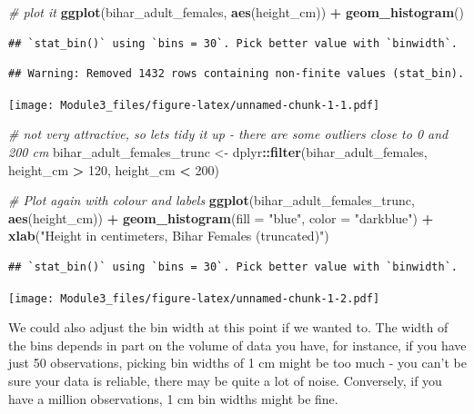\documentclass[]{book}
\newenvironment{Shaded}{\begin{snugshade}}{\end{snugshade}}
\newcommand{\KeywordTok}[1]{\textcolor[rgb]{0.13,0.29,0.53}{\textbf{#1}}}
\newcommand{\DataTypeTok}[1]{\textcolor[rgb]{0.13,0.29,0.53}{#1}}
\newcommand{\DecValTok}[1]{\textcolor[rgb]{0.00,0.00,0.81}{#1}}
\newcommand{\StringTok}[1]{\textcolor[rgb]{0.31,0.60,0.02}{#1}}
\newcommand{\CommentTok}[1]{\textcolor[rgb]{0.56,0.35,0.01}{\textit{#1}}}
\newcommand{\OperatorTok}[1]{\textcolor[rgb]{0.81,0.36,0.00}{\textbf{#1}}}
\newcommand{\NormalTok}[1]{#1}
\theoremstyle{definition}
\theoremstyle{definition}
\theoremstyle{definition}
\theoremstyle{remark}
\begin{document}
\begin{Shaded}
\begin{Highlighting}[]
\CommentTok{# plot it}
\KeywordTok{ggplot}\NormalTok{(bihar_adult_females, }\KeywordTok{aes}\NormalTok{(height_cm)) }\OperatorTok{+}\StringTok{ }
\StringTok{  }\KeywordTok{geom_histogram}\NormalTok{()}
\end{Highlighting}
\end{Shaded}

\begin{verbatim}
## `stat_bin()` using `bins = 30`. Pick better value with `binwidth`.
\end{verbatim}

\begin{verbatim}
## Warning: Removed 1432 rows containing non-finite values (stat_bin).
\end{verbatim}

\texttt{[image: Module3\_files/figure-latex/unnamed-chunk-1-1.pdf]}

\begin{Shaded}
\begin{Highlighting}[]
\CommentTok{# not very attractive, so lets tidy it up - there are some outliers close to 0 and 200 cm}
\NormalTok{bihar_adult_females_trunc <-}\StringTok{ }\NormalTok{dplyr}\OperatorTok{::}\KeywordTok{filter}\NormalTok{(bihar_adult_females, height_cm }\OperatorTok{>}\StringTok{ }\DecValTok{120}\NormalTok{, height_cm }\OperatorTok{<}\StringTok{ }\DecValTok{200}\NormalTok{)}

\CommentTok{# Plot again with colour and labels}
\KeywordTok{ggplot}\NormalTok{(bihar_adult_females_trunc, }\KeywordTok{aes}\NormalTok{(height_cm)) }\OperatorTok{+}\StringTok{ }
\StringTok{  }\KeywordTok{geom_histogram}\NormalTok{(}\DataTypeTok{fill =} \StringTok{"blue"}\NormalTok{, }\DataTypeTok{color =} \StringTok{"darkblue"}\NormalTok{) }\OperatorTok{+}\StringTok{ }
\StringTok{  }\KeywordTok{xlab}\NormalTok{(}\StringTok{"Height in centimeters, Bihar Females (truncated)"}\NormalTok{)}
\end{Highlighting}
\end{Shaded}

\begin{verbatim}
## `stat_bin()` using `bins = 30`. Pick better value with `binwidth`.
\end{verbatim}

\texttt{[image: Module3\_files/figure-latex/unnamed-chunk-1-2.pdf]}

We could also adjust the bin width at this point if we wanted to. The
width of the bins depends in part on the volume of data you have, for
instance, if you have just 50 observations, picking bin widths of 1 cm
might be too much - you can't be sure your data is reliable, there may
be quite a lot of noise. Conversely, if you have a million observations,
1 cm bin widths might be fine.
\end{document}
